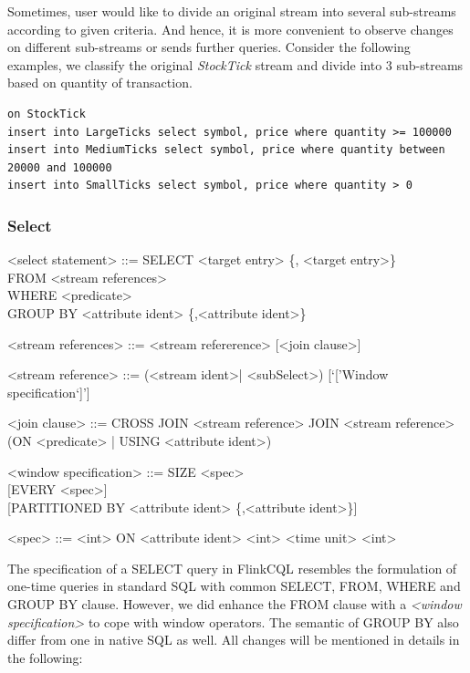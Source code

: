 Sometimes, user would like to divide an original stream into several sub-streams according to given criteria. And hence, it is more convenient to observe changes on different sub-streams or sends further queries. Consider the following examples, we classify the original \textit{StockTick} stream and divide into 3 sub-streams based on quantity of transaction.

\begin{verbatim}
on StockTick
insert into LargeTicks select symbol, price where quantity >= 100000
insert into MediumTicks select symbol, price where quantity between 20000 and 100000
insert into SmallTicks select symbol, price where quantity > 0
\end{verbatim}

\subsubsection{Select}
\begin{grammar}
<select statement> ::= SELECT <target entry> \{, <target entry>\}\\
	FROM <stream references> \\
	WHERE <predicate> \\
	GROUP BY <attribute ident> \{,<attribute ident>\}
	
<stream references> ::= <stream refererence> [<join clause>]

<stream reference> ::= (<stream ident>| <subSelect>) [`['Window specification`]']

<join clause> ::= CROSS JOIN <stream reference>
				\alt [INNER] JOIN <stream  reference> (ON <predicate> | USING <attribute ident>)

<window specification> ::= 
								SIZE <spec> \\
								{ }[EVERY <spec>]\\
								{ }[PARTITIONED BY <attribute ident> \{,<attribute ident>\}]

<spec> ::= <int> ON <attribute ident>
			\alt <int> <time unit>
			\alt <int>
\end{grammar}

The specification of a SELECT query in FlinkCQL resembles the formulation of one-time queries in standard SQL with common SELECT, FROM, WHERE and GROUP BY clause. However, we did enhance the FROM clause with a \textit{<window specification>} to cope with window operators. The semantic of GROUP BY  also differ from one in native SQL as well. All changes will be mentioned in details in the following:

